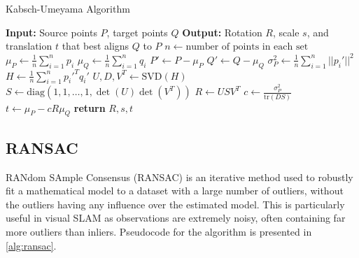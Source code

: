 \begin{algorithm}[H]\small
    \caption{Kabsch-Umeyama Algorithm}
    \label{alg:kabsch-umeyama}
    \begin{algorithmic}[1]
        \State \textbf{Input:} Source points $P$, target points $Q$
        \State \textbf{Output:} Rotation $R$, scale $s$, and translation $t$ that best aligns $Q$ to $P$
        \State $n \gets \text{number of points in each set}$
        \State $\mu_P \gets \frac{1}{n} \sum_{i=1}^n p_i$
        \State $\mu_Q \gets \frac{1}{n} \sum_{i=1}^n q_i$
        \State $P' \gets P - \mu_P$ 
        \State $Q' \gets Q - \mu_Q$ 
        \State $\sigma^2_P \gets \frac{1}{n} \sum_{i=1}^n ||p_i'||^2$ 
        \State $H \gets \frac{1}{n} \sum_{i=1}^n p_i'^T q_i'$ 
        \State $U, D, V^T \gets \text{SVD}(H)$ 
        \State $S \gets \text{diag}(1, 1, \dots, 1, \det(U)\det(V^T))$
        \State $R \gets USV^T$ 
        \State $c \gets \frac{\sigma^2_P}{\text{tr}(DS)}$ 
        \State $t \gets \mu_P - cR\mu_Q$ 
        \State \textbf{return} $R, s, t$
    \end{algorithmic}
\end{algorithm}

\subsection{RANSAC}
\label{sec:ransac}

RANdom SAmple Consensus (RANSAC) is an iterative method used to robustly fit a mathematical model to a dataset with a large number of outliers, without the outliers having any influence over the estimated model. This is particularly useful in visual SLAM as observations are extremely noisy, often containing far more outliers than inliers. Pseudocode for the algorithm is presented in \autoref{alg:ransac}.

